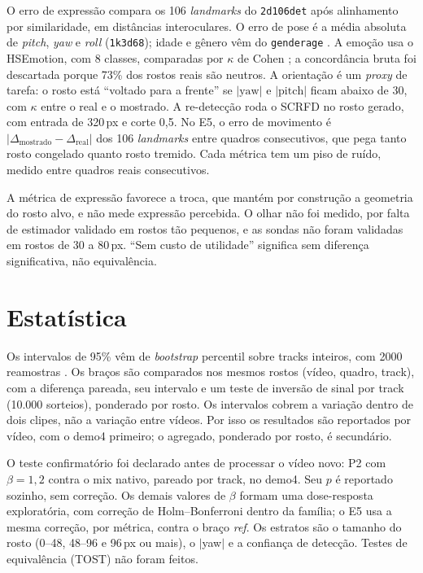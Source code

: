 O erro de expressão compara os 106 \emph{landmarks} do \texttt{2d106det} após alinhamento por similaridade, em distâncias interoculares. O erro de pose é a média absoluta de \emph{pitch}, \emph{yaw} e \emph{roll} (\texttt{1k3d68}); idade e gênero vêm do \texttt{genderage} \citep{insightface}. A emoção usa o HSEmotion, com 8 classes, comparadas por $\kappa$ de Cohen \citep{hsemotion,cohen}; a concordância bruta foi descartada porque 73\% dos rostos reais são neutros. A orientação é um \emph{proxy} de tarefa: o rosto está ``voltado para a frente'' se $|\mathrm{yaw}|$ e $|\mathrm{pitch}|$ ficam abaixo de 30\textdegree, com $\kappa$ entre o real e o mostrado. A re-detecção roda o SCRFD no rosto gerado, com entrada de 320\,px e corte 0,5. No E5, o erro de movimento é $|\Delta_{\mathrm{mostrado}} - \Delta_{\mathrm{real}}|$ dos 106 \emph{landmarks} entre quadros consecutivos, que pega tanto rosto congelado quanto rosto tremido. Cada métrica tem um piso de ruído, medido entre quadros reais consecutivos.

A métrica de expressão favorece a troca, que mantém por construção a geometria do rosto alvo, e não mede expressão percebida. O olhar não foi medido, por falta de estimador validado em rostos tão pequenos, e as sondas não foram validadas em rostos de 30 a 80\,px. ``Sem custo de utilidade'' significa sem diferença significativa, não equivalência.

\section{Estatística}

Os intervalos de 95\% vêm de \emph{bootstrap} percentil sobre tracks inteiros, com 2000 reamostras \citep{efron}. Os braços são comparados nos mesmos rostos (vídeo, quadro, track), com a diferença pareada, seu intervalo e um teste de inversão de sinal por track (10.000 sorteios), ponderado por rosto. Os intervalos cobrem a variação dentro de dois clipes, não a variação entre vídeos. Por isso os resultados são reportados por vídeo, com o demo4 primeiro; o agregado, ponderado por rosto, é secundário.

O teste confirmatório foi declarado antes de processar o vídeo novo: P2 com $\beta = 1{,}2$ contra o mix nativo, pareado por track, no demo4. Seu $p$ é reportado sozinho, sem correção. Os demais valores de $\beta$ formam uma dose-resposta exploratória, com correção de Holm--Bonferroni dentro da família; o E5 usa a mesma correção, por métrica, contra o braço \emph{ref}. Os estratos são o tamanho do rosto (0--48, 48--96 e 96\,px ou mais), o $|$yaw$|$ e a confiança de detecção. Testes de equivalência (TOST) não foram feitos.

